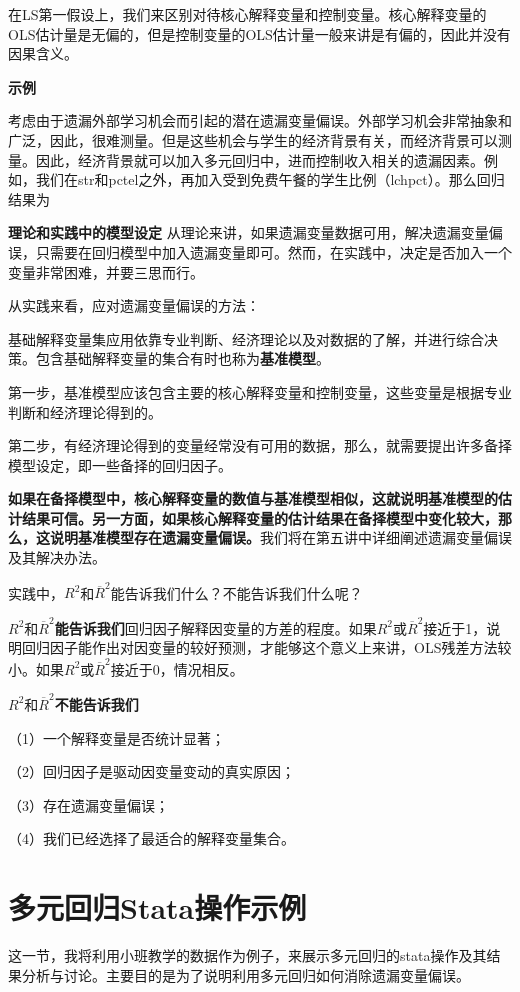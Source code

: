 \documentclass[cn,10pt,math=newtx,citestyle=gb7714-2015,bibstyle=gb7714-2015]{elegantbook}
\begin{document}
	在LS第一假设上，我们来区别对待核心解释变量和控制变量。核心解释变量的OLS估计量是无偏的，但是控制变量的OLS估计量一般来讲是有偏的，因此并没有因果含义。
	
	\textbf{示例}
	
	考虑由于遗漏外部学习机会而引起的潜在遗漏变量偏误。外部学习机会非常抽象和广泛，因此，很难测量。但是这些机会与学生的经济背景有关，而经济背景可以测量。因此，经济背景就可以加入多元回归中，进而控制收入相关的遗漏因素。例如，我们在str和pctel之外，再加入受到免费午餐的学生比例（lchpct）。那么回归结果为
	
	\textbf{理论和实践中的模型设定}
	从理论来讲，如果遗漏变量数据可用，解决遗漏变量偏误，只需要在回归模型中加入遗漏变量即可。然而，在实践中，决定是否加入一个变量非常困难，并要三思而行。
	
	从实践来看，应对遗漏变量偏误的方法：
	
	基础解释变量集应用依靠专业判断、经济理论以及对数据的了解，并进行综合决策。包含基础解释变量的集合有时也称为\textbf{基准模型}。
	
	第一步，基准模型应该包含主要的核心解释变量和控制变量，这些变量是根据专业判断和经济理论得到的。
	
	第二步，有经济理论得到的变量经常没有可用的数据，那么，就需要提出许多备择模型设定，即一些备择的回归因子。
	
	\textbf{如果在备择模型中，核心解释变量的数值与基准模型相似，这就说明基准模型的估计结果可信。另一方面，如果核心解释变量的估计结果在备择模型中变化较大，那么，这说明基准模型存在遗漏变量偏误。}我们将在第五讲中详细阐述遗漏变量偏误及其解决办法。
	
	实践中，$R^2$和$\overline{R}^2$能告诉我们什么？不能告诉我们什么呢？
	
	$R^2$和$\overline{R}^2$\textbf{能告诉我们}回归因子解释因变量的方差的程度。如果$R^2$或$\overline{R}^2$接近于1，说明回归因子能作出对因变量的较好预测，才能够这个意义上来讲，OLS残差方法较小。如果$R^2$或$\overline{R}^2$接近于0，情况相反。
	
	$R^2$和$\overline{R}^2$\textbf{不能告诉我们}
	
	（1）一个解释变量是否统计显著；
	
	（2）回归因子是驱动因变量变动的真实原因；
	
	（3）存在遗漏变量偏误；
	
	（4）我们已经选择了最适合的解释变量集合。
	
	\section{多元回归Stata操作示例}
	这一节，我将利用小班教学的数据作为例子，来展示多元回归的stata操作及其结果分析与讨论。主要目的是为了说明利用多元回归如何消除遗漏变量偏误。
	
\end{document}
